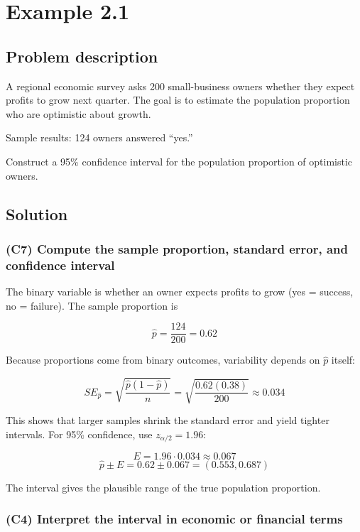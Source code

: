 \section{Example 2.1}\label{sec:interval-example2-1}

\subsection{Problem description}\label{subsec:interval-example2-1-problem}

A regional economic survey asks 200 small-business owners whether they expect profits to grow next quarter. The goal is to estimate the population proportion who are optimistic about growth.

Sample results: 124 owners answered ``yes.''

Construct a 95\% confidence interval for the population proportion of optimistic owners.

\subsection{Solution}\label{subsec:interval-example2-1-solution}

\subsubsection{(C7) Compute the sample proportion, standard error, and confidence interval}\label{subsubsec:interval-example2-1-c7}

The binary variable is whether an owner expects profits to grow (yes = success, no = failure). The sample proportion is

\[
\hat{p} = \frac{124}{200} = 0.62
\]

Because proportions come from binary outcomes, variability depends on \(\hat{p}\) itself:

\[
SE_{\hat{p}} = \sqrt{\frac{\hat{p}(1 - \hat{p})}{n}} = \sqrt{\frac{0.62(0.38)}{200}} \approx 0.034
\]

This shows that larger samples shrink the standard error and yield tighter intervals. For 95\% confidence, use \(z_{\alpha/2} = 1.96\):

\[
E = 1.96 \cdot 0.034 \approx 0.067
\]
\[
\hat{p} \pm E = 0.62 \pm 0.067 = (0.553, 0.687)
\]

The interval gives the plausible range of the true population proportion.

\subsubsection{(C4) Interpret the interval in economic or financial terms}\label{subsubsec:interval-example2-1-c4}


